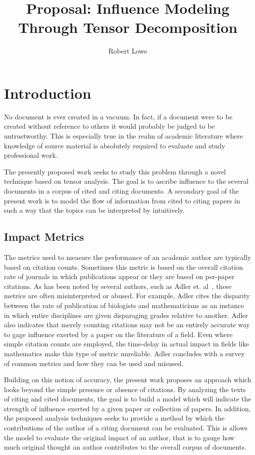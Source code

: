 \documentclass{article}
\title{Proposal: Influence Modeling Through Tensor Decomposition}
\author{Robert Lowe}
\begin{document}
\maketitle

\section{Introduction}
No document is ever created in a vacuum.  In fact, if a document were
to be created without reference to others it would probably be judged
to be untrustworthy.  This is especially true in the realm of
academic literature where knowledge of source material is absolutely
required to evaluate and study professional work. 

The presently proposed work seeks to study this problem through
a novel technique based on tensor analysis.  The goal is to ascribe
influence to the several documents in a corpus of cited and citing
documents. A secondary goal of the present work is to model the flow
of information from cited to citing papers in such a way that the
topics can be interpreted by intuitively.

\subsection{Impact Metrics}
The metrics used to measure the performance of an academic author are
typically based on citation counts.  Sometimes this metric is based on
the overall citation rate of journals in which publications appear or
they are based on per-paper citations.  As has been noted by several
authors, such as Adler et. al~\cite{adler2009}, these metrics are
often misinterpreted or abused.  For example, Adler cites the
disparity between the rate of publication of biologists and
mathematicians as an instance in which entire disciplines are given
disparaging grades relative to another. Adler also indicates that
merely counting citations may not be an entirely accurate way to gage
influence exerted by a paper on the literature of a field.  Even where
simple citation counts are employed, the time-delay in actual impact
in fields like mathematics make this type of metric unreliable.  Adler
concludes with a survey of common metrics and how they can be used and
misused.

Building on this notion of accuracy, the present work proposes an
approach which looks beyond the simple presence or absence of
citations.  By analyzing the texts of citing and cited documents, the
goal is to build a model which will indicate the strength of influence
exerted by a given paper or collection of papers.  In addition, the
proposed analysis techniques seeks to provide a method by which the
contributions of the author of a citing document can be evaluated.
This is allows the model to evaluate the original impact of an author,
that is to gauge how much original thought an author contributes to
the overall corpus of documents. 
\end{document}

